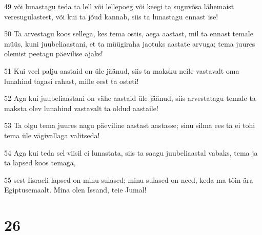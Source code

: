 \par 49 või lunastagu teda ta lell või lellepoeg või keegi ta suguvõsa lähemaist veresugulastest, või kui ta jõud kannab, siis ta lunastagu ennast ise!
\par 50 Ta arvestagu koos sellega, kes tema ostis, aega aastast, mil ta ennast temale müüs, kuni juubeliaastani, et ta müügiraha jaotuks aastate arvuga; tema juures olemist peetagu päevilise ajaks!
\par 51 Kui veel palju aastaid on üle jäänud, siis ta maksku neile vastavalt oma lunahind tagasi rahast, mille eest ta osteti!
\par 52 Aga kui juubeliaastani on vähe aastaid üle jäänud, siis arvestatagu temale ta maksta olev lunahind vastavalt ta oldud aastaile!
\par 53 Ta olgu tema juures nagu päeviline aastast aastasse; sinu silma ees ta ei tohi tema üle vägivallaga valitseda!
\par 54 Aga kui teda sel viisil ei lunastata, siis ta saagu juubeliaastal vabaks, tema ja ta lapsed koos temaga,
\par 55 sest Iisraeli lapsed on minu sulased; minu sulased on need, keda ma tõin ära Egiptusemaalt. Mina olen Issand, teie Jumal!

\chapter{26}


